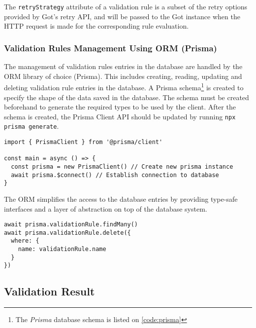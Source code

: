       The \verb;retryStrategy; attribute of a validation rule is a subset of the retry options provided by Got's retry API, and will be passed to the Got instance when the HTTP request is made for the corresponding rule evaluation. 

    \subsubsection{Validation Rules Management Using ORM (Prisma)} 
      The management of validation rules entries in the database are handled by the ORM library of choice (Prisma). This includes creating, reading, updating and deleting validation rule entries in the database. A Prisma schema\footnote{The \emph{Prisma} database schema is listed on \autoref{code:prisma}} is created to specify the shape of the data saved in the database. The schema must be created beforehand to generate the required types to be used by the client. After the schema is created, the Prisma Client API should be updated by running \verb;npx prisma generate;. 

      \begin{lstlisting}[style=es6, caption={Establishing database connection with Prisma (TypeScript)}]
import { PrismaClient } from '@prisma/client'

const main = async () => {
  const prisma = new PrismaClient() // Create new prisma instance
  await prisma.$connect() // Establish connection to database
}
      \end{lstlisting}  

      The ORM simplifies the access to the database entries by providing type-safe interfaces and a layer of abstraction on top of the database system. 

      \begin{lstlisting}[style=es6, caption={Example usage of Prisma (TypeScript)}]
await prisma.validationRule.findMany()
await prisma.validationRule.delete({
  where: {
    name: validationRule.name
  }
})
      \end{lstlisting}


  \subsection{Validation Result}
  
